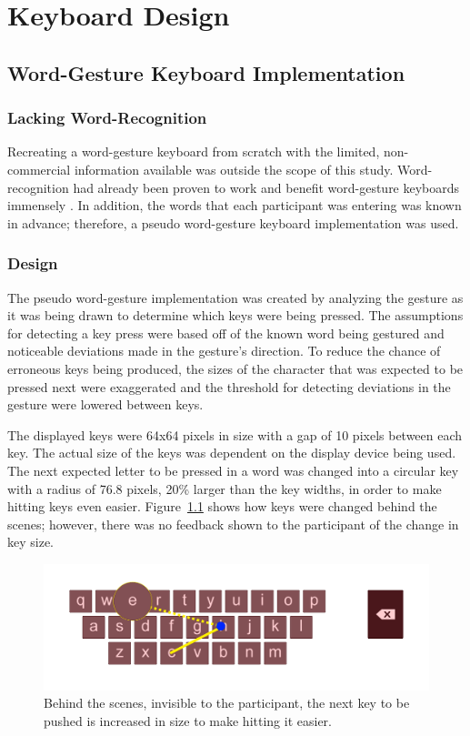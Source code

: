 \chapter{Keyboard Design} \label{keyboard_design}

\section{Word-Gesture Keyboard Implementation}
\subsection{Lacking Word-Recognition}
Recreating a word-gesture keyboard from scratch with the limited, non-commercial information available was outside the scope of this study. Word-recognition had already been proven to work and benefit word-gesture keyboards immensely \cite{ref_shape_writing,ref_the_word_gesture_keyboard,ref_shapewriter_iphone,ref_shark_wgk,ref_shorthand_writing}. In addition, the words that each participant was entering was known in advance; therefore, a pseudo word-gesture keyboard implementation was used.

\subsection{Design}
The pseudo word-gesture implementation was created by analyzing the gesture as it was being drawn to determine which keys were being pressed. The assumptions for detecting a key press were based off of the known word being gestured and noticeable deviations made in the gesture's direction. To reduce the chance of erroneous keys being produced, the sizes of the character that was expected to be pressed next were exaggerated and the threshold for detecting deviations in the gesture were lowered between keys.

The displayed keys were 64x64 pixels in size with a gap of 10 pixels between each key. The actual size of the keys was dependent on the display device being used. The next expected letter to be pressed in a word was changed into a circular key with a radius of 76.8 pixels, 20\% larger than the key widths, in order to make hitting keys even easier. Figure~\ref{key_bloating} shows how keys were changed behind the scenes; however, there was no feedback shown to the participant of the change in key size.

\begin{figure}[h]
	\centering
	\includegraphics[width=5in]{fig_bloat_key}
	\caption[Larger Key Example]{Behind the scenes, invisible to the participant, the next key to be pushed is increased in size to make hitting it easier.}
	\label{key_bloating}
\end{figure}

